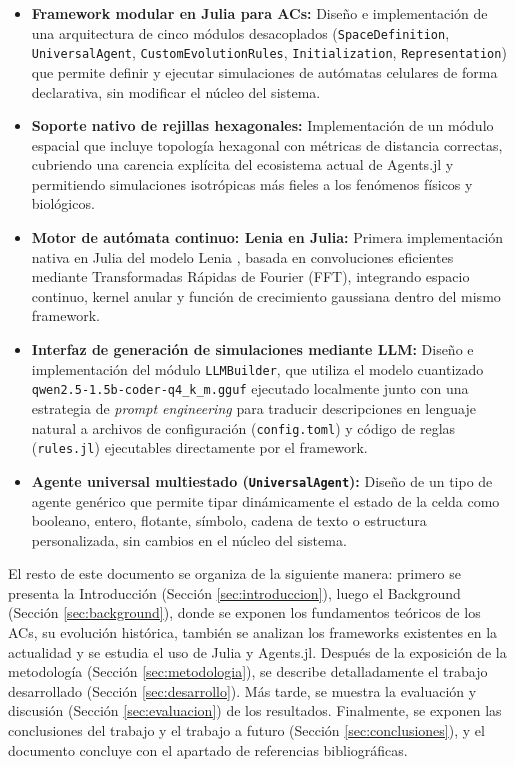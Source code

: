 \documentclass[runningheads]{llncs}
\begin{document}
\begin{itemize}
    \item \textbf{Framework modular en Julia para ACs:} Diseño e implementación de una arquitectura de cinco módulos desacoplados (\texttt{SpaceDefinition}, \texttt{UniversalAgent}, \texttt{CustomEvolutionRules}, \texttt{Initialization}, \texttt{Representation}) que permite definir y ejecutar simulaciones de autómatas celulares de forma declarativa, sin modificar el núcleo del sistema.
    \item \textbf{Soporte nativo de rejillas hexagonales:} Implementación de un módulo espacial que incluye topología hexagonal con métricas de distancia correctas, cubriendo una carencia explícita del ecosistema actual de Agents.jl y permitiendo simulaciones isotrópicas más fieles a los fenómenos físicos y biológicos.
    \item \textbf{Motor de autómata continuo: Lenia en Julia:} Primera implementación nativa en Julia del modelo Lenia \cite{ref_lenia}, basada en convoluciones eficientes mediante Transformadas Rápidas de Fourier (FFT), integrando espacio continuo, kernel anular y función de crecimiento gaussiana dentro del mismo framework.
    \item \textbf{Interfaz de generación de simulaciones mediante LLM:} Diseño e implementación del módulo \texttt{LLMBuilder}, que utiliza el modelo cuantizado \texttt{qwen2.5-1.5b-coder-q4\_k\_m.gguf} ejecutado localmente junto con una estrategia de \textit{prompt engineering} para traducir descripciones en lenguaje natural a archivos de configuración (\texttt{config.toml}) y código de reglas (\texttt{rules.jl}) ejecutables directamente por el framework.
    \item \textbf{Agente universal multiestado (\texttt{UniversalAgent}):} Diseño de un tipo de agente genérico que permite tipar dinámicamente el estado de la celda como booleano, entero, flotante, símbolo, cadena de texto o estructura personalizada, sin cambios en el núcleo del sistema.
\end{itemize}

El resto de este documento se organiza de la siguiente manera: primero se presenta la Introducción (Sección \ref{sec:introduccion}), luego el Background (Sección \ref{sec:background}), donde se exponen los fundamentos teóricos de los ACs, su evolución histórica, también se analizan los frameworks existentes en la actualidad y se estudia el uso de Julia y Agents.jl. Después de la exposición de la metodología (Sección \ref{sec:metodologia}), se describe detalladamente el trabajo desarrollado (Sección \ref{sec:desarrollo}). Más tarde, se muestra la evaluación y discusión (Sección \ref{sec:evaluacion}) de los resultados. Finalmente, se exponen las conclusiones  del trabajo y el trabajo a futuro (Sección \ref{sec:conclusiones}), y el documento concluye con el apartado de referencias bibliográficas.
\end{document}
